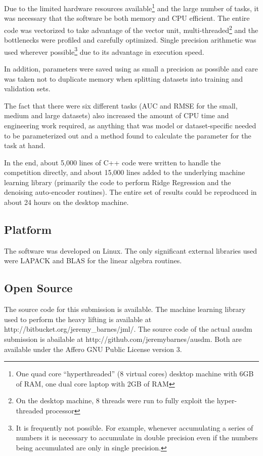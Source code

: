 \documentclass{article}
\begin{document}
Due to the limited hardware resources available\footnote{One quad core ``hyperthreaded'' (8 virtual cores) desktop machine with 6GB of RAM, one dual core laptop with 2GB of RAM} and the large number of tasks, it was necessary that the software be both memory and CPU efficient.
The entire code was vectorized to take advantage of the vector unit, multi-threaded\footnote{On the desktop machine, 8 threads were run to fully exploit the hyper-threaded processor} and the bottlenecks were profiled and carefully optimized.  Single precision arithmetic was used wherever possible\footnote{It is frequently not possible.  For example, whenever accumulating a series of numbers it is necessary to accumulate in double precision even if the numbers being accumulated are only in single precision.} due to its advantage in execution speed.

In addition, parameters were saved using as small a precision as possible and care was taken not to duplicate memory when splitting datasets into training and validation sets.

The fact that there were six different tasks (AUC and RMSE for the small, medium and large datasets) also increased the amount of CPU time and engineering work required, as anything that was model or dataset-specific needed to be parameterized out and a method found to calculate the parameter for the task at hand.

In the end, about 5,000 lines of C++ code were written to handle the competition directly, and about 15,000 lines added to the underlying machine learning library (primarily the code to perform Ridge Regression and the denoising auto-encoder routines).  The entire set of results could be reproduced in about 24 hours on the desktop machine.

\subsection{Platform}

The software was developed on Linux.  The only significant external libraries used were LAPACK and BLAS for the linear algebra routines.

\subsection{Open Source}

The source code for this submission is available.  The machine learning library used to perform the heavy lifting is available at http://bitbucket.org/jeremy\_barnes/jml/.  The source code of the actual ausdm submission is abailable at http://github.com/jeremybarnes/ausdm.  Both are available under the Affero GNU Public License version 3.
\end{document}
